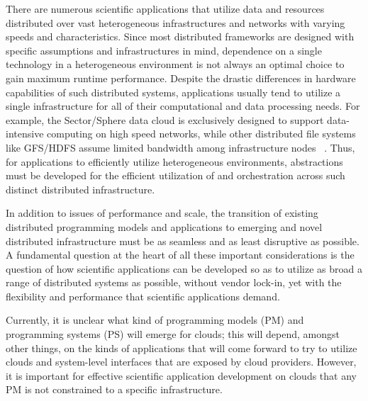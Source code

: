 \documentclass[3p,twocolumn]{elsarticle}
\begin{document}
There are numerous scientific applications that utilize data and
resources distributed over vast heterogeneous infrastructures and
networks with varying speeds and characteristics. Since most
distributed frameworks are designed with specific assumptions and
infrastructures in mind, dependence on a single technology in a
heterogeneous environment is not always an optimal choice to gain
maximum runtime performance. Despite the drastic differences in
hardware capabilities of such distributed systems, applications
usually tend to utilize a single infrastructure for all of their
computational and data processing needs. For example, the
Sector/Sphere data cloud is exclusively designed to support
data-intensive computing on high speed networks, while other
distributed file systems like GFS/HDFS assume limited bandwidth among
infrastructure nodes ~\cite{GFS, HDFS}. Thus, for applications to
efficiently utilize heterogeneous environments, abstractions must be
developed for the efficient utilization of and orchestration across
such distinct distributed infrastructure.

In addition to issues of performance and scale, the transition of
existing distributed programming models and applications to emerging
and novel distributed infrastructure must be as seamless and as least
disruptive as possible.  A fundamental question at the heart of all
these important considerations is the question of how scientific
applications can be developed so as to utilize as broad a range of
distributed systems as possible, without vendor lock-in, yet with the
flexibility and performance that scientific applications demand.

Currently, it is unclear what kind of programming models (PM) and
programming systems (PS) will emerge for clouds; this will depend,
amongst other things, on the kinds of applications that will come
forward to try to utilize clouds and system-level interfaces that are
exposed by cloud providers.  However, it is important for effective
scientific application development on clouds that any PM is not
constrained to a specific infrastructure.  

\end{document}
